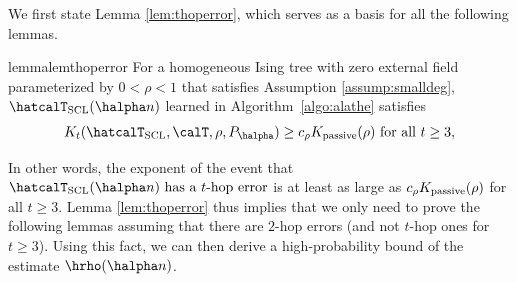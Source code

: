 \documentclass[11pt,onecolumn]{article}
\newcommand{\Passive}{{\rm passive}}
\begin{document}
We first state Lemma \ref{lem:thoperror}, which serves as a basis for all the following lemmas.
\begin{restatable}{lemma}{lemthoperror}
\label{lem:thoperror}
For a homogeneous Ising tree with zero external field parameterized by $0<\rho<1$ that satisfies Assumption \ref{assump:smalldeg}, $\hatcalT_{\rm{SCL}}(\halpha n)$ learned in Algorithm~\ref{algo:alathe} satisfies
\begin{align}
	K _{t}(\hatcalT_{{\rm SCL}},\calT,\rho,P_{\halpha})\geq c_{\rho}K _{\Passive}(\rho) \text{ for all }t\geq 3,
\end{align}
\end{restatable}
In other words, the exponent of the event that $\hatcalT_{\rm{SCL}}(\halpha n) \text{ has a }t\text{-hop error}$ is at least as large as $c_{\rho}K _{\Passive}(\rho)$ for all $t\geq 3$. Lemma \ref{lem:thoperror} thus implies 
that we only need to prove the following lemmas assuming that 
there are  $2$-hop errors (and not $t$-hop ones for $t\ge3$). 
Using this fact, we can then derive a high-probability bound of the estimate $\hrho(\halpha n)$.
\end{document}
